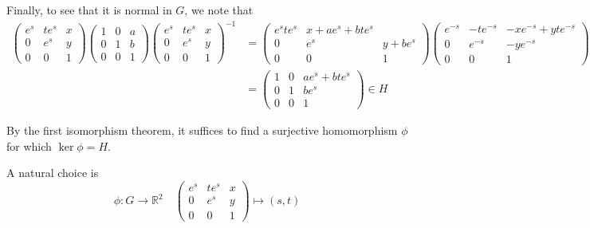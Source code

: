 \documentclass[12pt]{article}
\newcommand{\R}{\mathbb{R}}
\begin{document}
        Finally, to see that it is normal in $G$, we note that 
        \begin{align*}
            \begin{pmatrix}
                e^{s} & te^{s} & x\\
                0 & e^{s} & y\\
                0 & 0 & 1
            \end{pmatrix} \begin{pmatrix}
                1 & 0 & a\\
                0 & 1 & b\\
                0 & 0 & 1
            \end{pmatrix}\begin{pmatrix}
                e^{s} & te^{s} & x\\
                0 & e^{s} & y\\
                0 & 0 & 1
            \end{pmatrix}^{-1} &= \begin{pmatrix}
                e^s te^s & x + ae^s + bte^s\\
                0 & e^s & y + be^s\\
                0 & 0 & 1
            \end{pmatrix} \begin{pmatrix}
                e^{-s} & -te^{-s} & -xe^{-s} + yte^{-s}\\
                0 & e^{-s} & -ye^{-s}\\
                0 & 0 & 1
            \end{pmatrix}\\ 
            &= \begin{pmatrix}
                1 & 0 & ae^s + bte^s\\
                0 & 1 & be^s\\
                0 & 0 & 1
            \end{pmatrix} \in H
        \end{align*}
        
        By the first isomorphism theorem, it suffices to find a surjective homomorphism $\phi$ for which $\ker \phi = H$.  
        
        A natural choice is 
        \[\phi: G \to \R^2 \quad \begin{pmatrix}
            e^s & te^s & x\\
            0 & e^s & y\\
            0 & 0 & 1
        \end{pmatrix} \mapsto (s,t)\] 
\end{document}
